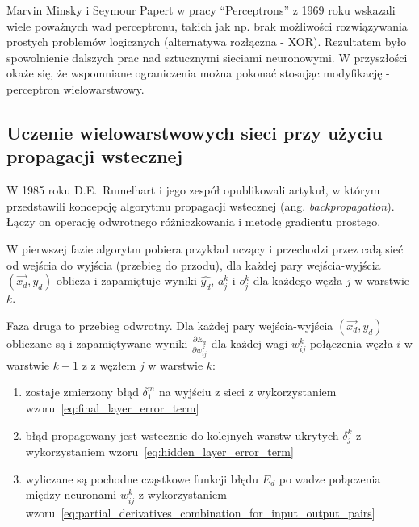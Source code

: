 \documentclass[a4paper,12pt]{article}
\numberwithin{figure}{section}
\begin{document}
    \bigskip

    Marvin Minsky i Seymour Papert w pracy ``Perceptrons'' z 1969 roku wskazali wiele poważnych wad perceptronu, takich jak np. brak możliwości rozwiązywania prostych problemów logicznych (alternatywa rozłączna - XOR). Rezultatem było spowolnienie dalszych prac nad sztucznymi sieciami neuronowymi. W przyszłości okaże się, że wspomniane ograniczenia można pokonać stosując modyfikację - perceptron wielowarstwowy\cite{UczenieMaszynowe2018}.

    \subsection{Uczenie wielowarstwowych sieci przy użyciu propagacji wstecznej}

    W 1985 roku D.E.\ Rumelhart i jego zespół opublikowali artykuł\cite{Backpropagation1985}, w którym przedstawili koncepcję algorytmu propagacji wstecznej (ang. \textit{backpropagation}).
    Łączy on operację odwrotnego różniczkowania i metodę gradientu prostego.

    \bigskip

    W pierwszej fazie algorytm pobiera przykład uczący i przechodzi przez całą sieć od wejścia do wyjścia (przebieg do przodu), dla każdej pary wejścia-wyjścia $(\vec{x_d}, y_d)$ oblicza i zapamiętuje wyniki $\widehat{y_d}$, $a_j^k$ i $o_j^k$ dla każdego węzła $j$ w warstwie $k$.

    \bigskip

    Faza druga to przebieg odwrotny. Dla każdej pary wejścia-wyjścia $(\vec{x_d}, y_d)$ obliczane są i zapamiętywane wyniki $\frac{\partial E_d}{\partial w_{ij}^k}$ dla każdej wagi $w_{ij}^k$ połączenia węzła $i$ w warstwie $k-1$ z z węzłem $j$ w warstwie $k$:
    \begin{enumerate}
        \item zostaje zmierzony błąd $\delta_1^m$ na wyjściu z sieci z wykorzystaniem wzoru~\ref{eq:final_layer_error_term}
        \item błąd propagowany jest wstecznie do kolejnych warstw ukrytych $\delta_j^k$ z wykorzystaniem wzoru~\ref{eq:hidden_layer_error_term}
        \item wyliczane są pochodne cząstkowe funkcji błędu $E_d$ po wadze połączenia między neuronami $w_{ij}^k$ z wykorzystaniem wzoru~\ref{eq:partial_derivatives_combination_for_input_output_pairs}
    \end{enumerate}

    \bigskip
\end{document}
